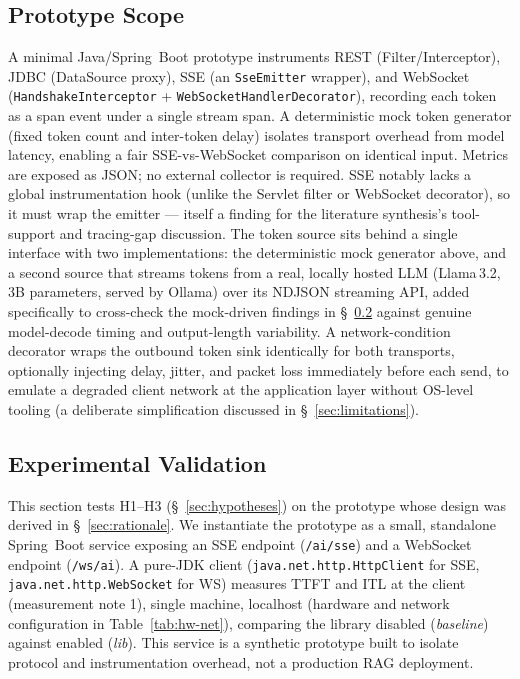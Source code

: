 \documentclass[11pt]{article}
\begin{document}
\subsection{Prototype Scope}
A minimal Java/Spring~Boot prototype instruments REST (Filter/Interceptor), JDBC (DataSource proxy), SSE (an \texttt{SseEmitter} wrapper), and WebSocket (\texttt{HandshakeInterceptor} + \texttt{WebSocketHandlerDecorator}), recording each token as a span event under a single stream span. A deterministic mock token generator (fixed token count and inter-token delay) isolates transport overhead from model latency, enabling a fair SSE-vs-WebSocket comparison on identical input. Metrics are exposed as JSON; no external collector is required. SSE notably lacks a global instrumentation hook (unlike the Servlet filter or WebSocket decorator), so it must wrap the emitter --- itself a finding for the literature synthesis's tool-support and tracing-gap discussion. The token source sits behind a single interface with two implementations: the deterministic mock generator above, and a second source that streams tokens from a real, locally hosted LLM (Llama\,3.2, 3B parameters, served by Ollama) over its NDJSON streaming API, added specifically to cross-check the mock-driven findings in \S~\ref{sec:experiment} against genuine model-decode timing and output-length variability. A network-condition decorator wraps the outbound token sink identically for both transports, optionally injecting delay, jitter, and packet loss immediately before each send, to emulate a degraded client network at the application layer without OS-level tooling (a deliberate simplification discussed in \S~\ref{sec:limitations}).

\subsection{Experimental Validation}
\label{sec:experiment}
This section tests H1--H3 (\S~\ref{sec:hypotheses}) on the prototype whose design was derived in \S~\ref{sec:rationale}. We instantiate the prototype as a small, standalone Spring~Boot service exposing an SSE endpoint (\texttt{/ai/sse}) and a WebSocket endpoint (\texttt{/ws/ai}). A pure-JDK client (\texttt{java.net.http.HttpClient} for SSE, \texttt{java.net.http.WebSocket} for WS) measures TTFT and ITL at the client (measurement note 1), single machine, localhost (hardware and network configuration in Table~\ref{tab:hw-net}), comparing the library disabled (\emph{baseline}) against enabled (\emph{lib}). This service is a synthetic prototype built to isolate protocol and instrumentation overhead, not a production RAG deployment.
\end{document}
